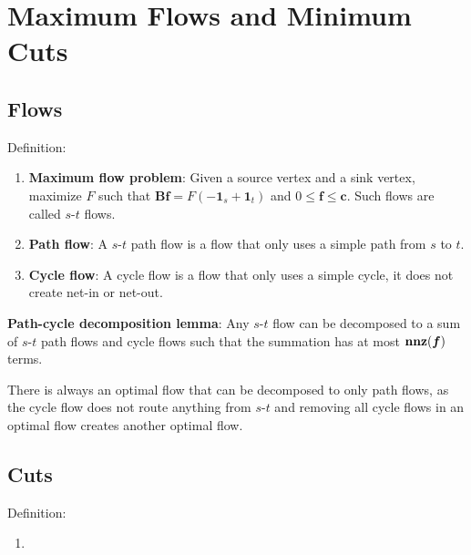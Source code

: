 \section{Maximum Flows and Minimum Cuts}

\subsection{Flows}
Definition:
\begin{enumerate}
    \item \textbf{Maximum flow problem}: Given a source vertex and a sink vertex, maximize $F$ such that $\boldsymbol{B}\boldsymbol{f} = F (-\boldsymbol{1}_s + \boldsymbol{1}_t)$ and $0 \le \boldsymbol{f} \le \boldsymbol{c}$. Such flows are called $s$-$t$ flows.
    \item \textbf{Path flow}: A $s$-$t$ path flow is a flow that only uses a simple path from $s$ to $t$.
    \item \textbf{Cycle flow}: A cycle flow is a flow that only uses a simple cycle, it does not create net-in or net-out.
\end{enumerate}

\textbf{Path-cycle decomposition lemma}: Any $s$-$t$ flow can be decomposed to a sum of $s$-$t$ path flows and cycle flows such that the summation has at most $\operatorname{\textbf{nnz}}(\boldsymbol{f})$ terms.

There is always an optimal flow that can be decomposed to only path flows, as the cycle flow does not route anything from $s$-$t$ and removing all cycle flows in an optimal flow creates another optimal flow.

\subsection{Cuts}

Definition:
\begin{enumerate}
    \item 
\end{enumerate}